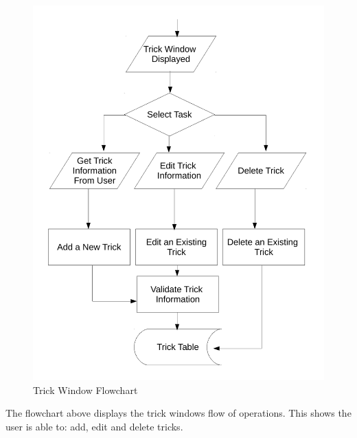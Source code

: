 \begin{figure}[H]
    \includegraphics[width=\textwidth]{./Design/TrickFlowchart.pdf}
    \caption{Trick Window Flowchart} \label{fig:Trick Flowchart}
\end{figure}

The flowchart above displays the trick windows flow of operations. This shows the user is able to: add, edit and delete tricks.


